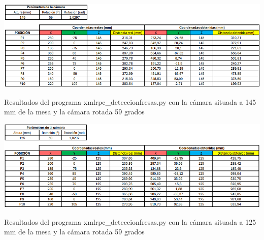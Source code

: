    \begin{table}[H]
     \centering
     \begin{center}
       \includegraphics[width=155mm]{figs/Resultados 145 mm 59 grados.png}
     \end{center}
     \caption{Resultados del programa xmlrpc\_deteccionfresas.py con la cámara situada a 145 mm de la mesa y la cámara rotada 59 grados}
     \label{tab:resultados_145mm_59grados}
  \end{table}
  
  \begin{table}[H]
     \centering
     \begin{center}
       \includegraphics[width=155mm]{figs/Resultados 125 mm 59 grados.png}
     \end{center}
     \caption{Resultados del programa xmlrpc\_deteccionfresas.py con la cámara situada a 125 mm de la mesa y la cámara rotada 59 grados}
     \label{tab:resultados_125mm_59grados}
  \end{table}

